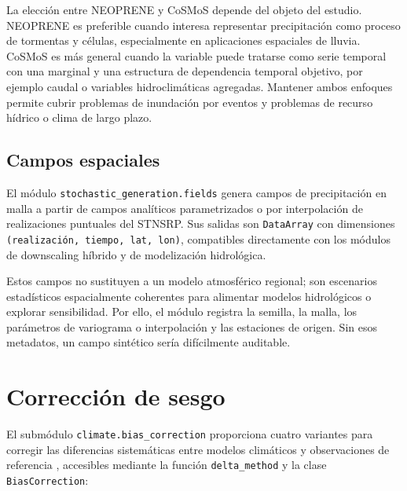 La elección entre NEOPRENE y CoSMoS depende del objeto del estudio. NEOPRENE es preferible cuando interesa representar precipitación como proceso de tormentas y células, especialmente en aplicaciones espaciales de lluvia. CoSMoS es más general cuando la variable puede tratarse como serie temporal con una marginal y una estructura de dependencia temporal objetivo, por ejemplo caudal o variables hidroclimáticas agregadas. Mantener ambos enfoques permite cubrir problemas de inundación por eventos y problemas de recurso hídrico o clima de largo plazo.

\subsection{Campos espaciales}

El módulo \texttt{stochastic\_generation.fields} genera campos de precipitación en malla a partir de campos analíticos parametrizados o por interpolación de realizaciones puntuales del STNSRP. Sus salidas son \texttt{DataArray} con dimensiones \texttt{(realización, tiempo, lat, lon)}, compatibles directamente con los módulos de downscaling híbrido y de modelización hidrológica.

Estos campos no sustituyen a un modelo atmosférico regional; son escenarios estadísticos espacialmente coherentes para alimentar modelos hidrológicos o explorar sensibilidad. Por ello, el módulo registra la semilla, la malla, los parámetros de variograma o interpolación y las estaciones de origen. Sin esos metadatos, un campo sintético sería difícilmente auditable.

\section{Corrección de sesgo}

El submódulo \texttt{climate.bias\_correction} proporciona cuatro variantes para corregir las diferencias sistemáticas entre modelos climáticos y observaciones de referencia \parencite{teutschbein2012biascorrection}, accesibles mediante la función \texttt{delta\_method} y la clase \texttt{BiasCorrection}:

